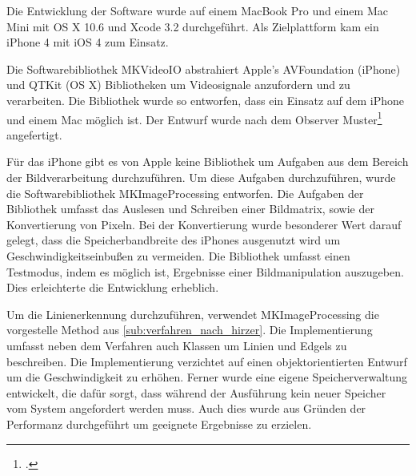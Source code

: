 Die Entwicklung der Software wurde auf einem MacBook Pro und einem Mac Mini mit OS X 10.6 und Xcode 3.2 durchgeführt.
 Als Zielplattform kam ein iPhone 4 mit iOS 4 zum Einsatz.

Die Softwarebibliothek MKVideoIO abstrahiert Apple's AVFoundation (iPhone) und QTKit (OS X) Bibliotheken um
 Videosignale anzufordern und zu verarbeiten. Die Bibliothek wurde so entworfen, dass ein Einsatz auf dem iPhone und
 einem Mac möglich ist. Der Entwurf wurde nach dem Observer Muster\footcite[Vgl.][S.~287--300]{gamma96} angefertigt.

Für das iPhone gibt es von Apple keine Bibliothek um Aufgaben aus dem Bereich der Bildverarbeitung durchzuführen. Um
 diese Aufgaben durchzuführen, wurde die Softwarebibliothek MKImageProcessing entworfen. Die Aufgaben der Bibliothek
 umfasst das Auslesen und Schreiben einer Bildmatrix, sowie der Konvertierung von Pixeln. Bei der Konvertierung wurde
 besonderer Wert darauf gelegt, dass die Speicherbandbreite des iPhones ausgenutzt wird um Geschwindigkeitseinbußen zu
 vermeiden. Die Bibliothek umfasst einen Testmodus, indem es möglich ist, Ergebnisse einer Bildmanipulation auszugeben.
 Dies erleichterte die Entwicklung erheblich.

Um die Linienerkennung durchzuführen, verwendet MKImageProcessing die vorgestelle Method aus
 \autoref{sub:verfahren_nach_hirzer}. Die Implementierung umfasst neben dem Verfahren auch Klassen um Linien und Edgels
 zu beschreiben. Die Implementierung verzichtet auf einen objektorientierten Entwurf um die Geschwindigkeit zu erhöhen.
 Ferner wurde eine eigene Speicherverwaltung entwickelt, die dafür sorgt, dass während der Ausführung kein neuer
 Speicher vom System angefordert werden muss. Auch dies wurde aus Gründen der Performanz durchgeführt um geeignete
 Ergebnisse zu erzielen.

